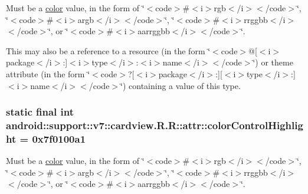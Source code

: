 Must be a \hyperlink{classandroid_1_1support_1_1v7_1_1cardview_1_1_r_1_1color}{color} value, in the form of \char`\"{}$<$code$>$\#$<$i$>$rgb$<$/i$>$$<$/code$>$\char`\"{}, \char`\"{}$<$code$>$\#$<$i$>$argb$<$/i$>$$<$/code$>$\char`\"{}, \char`\"{}$<$code$>$\#$<$i$>$rrggbb$<$/i$>$$<$/code$>$\char`\"{}, or \char`\"{}$<$code$>$\#$<$i$>$aarrggbb$<$/i$>$$<$/code$>$\char`\"{}. 

This may also be a reference to a resource (in the form \char`\"{}$<$code$>$@\mbox{[}$<$i$>$package$<$/i$>$:\mbox{]}$<$i$>$type$<$/i$>$:$<$i$>$name$<$/i$>$$<$/code$>$\char`\"{}) or theme attribute (in the form \char`\"{}$<$code$>$?\mbox{[}$<$i$>$package$<$/i$>$:\mbox{]}\mbox{[}$<$i$>$type$<$/i$>$:\mbox{]}$<$i$>$name$<$/i$>$$<$/code$>$\char`\"{}) containing a value of this type. \hypertarget{classandroid_1_1support_1_1v7_1_1cardview_1_1_r_1_1attr_771b92b1ebd9feca55f96821dee0627d}{
\subsubsection[{colorControlHighlight}]{\setlength{\rightskip}{0pt plus 5cm}static final int android::support::v7::cardview.R.R::attr::colorControlHighlight = 0x7f0100a1}}
\label{classandroid_1_1support_1_1v7_1_1cardview_1_1_r_1_1attr_771b92b1ebd9feca55f96821dee0627d}


Must be a \hyperlink{classandroid_1_1support_1_1v7_1_1cardview_1_1_r_1_1color}{color} value, in the form of \char`\"{}$<$code$>$\#$<$i$>$rgb$<$/i$>$$<$/code$>$\char`\"{}, \char`\"{}$<$code$>$\#$<$i$>$argb$<$/i$>$$<$/code$>$\char`\"{}, \char`\"{}$<$code$>$\#$<$i$>$rrggbb$<$/i$>$$<$/code$>$\char`\"{}, or \char`\"{}$<$code$>$\#$<$i$>$aarrggbb$<$/i$>$$<$/code$>$\char`\"{}. 

